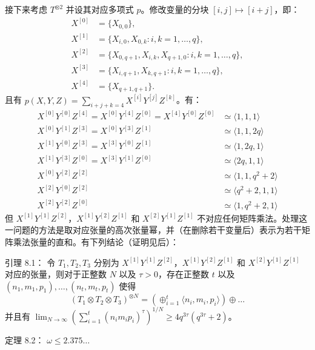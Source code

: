 \documentclass[11pt,fleqn, UTF8]{ctexbook} %
\begin{document}
接下来考虑 $T^{\otimes 2}$ 并设其对应多项式 $p$。修改变量的分块 $[i,j]\mapsto [i+j]$，即：
\begin{align}
X^{[0]}&=\{X_{0,0}\},\\
X^{[1]}&=\{X_{i,0}, X_{0,k}: i,k=1,\dots, q\},\\
X^{[2]}&=\{X_{0,q+1}, X_{i,k} ,X_{q+1,0}: i,k=1,\dots, q\},\\
X^{[3]}&=\{X_{i,q+1}, X_{k,q+1}: i,k=1,\dots, q\},\\
X^{[4]}&=\{X_{q+1,q+1}\}.
\end{align}
且有 $p(X,Y,Z)=\sum_{i+j+k=4} X^{[i]}Y^{[j]}Z^{[k]}$。有：
\begin{align}
X^{[0]}Y^{[0]}Z^{[4]}=X^{[0]}Y^{[4]}Z^{[0]}=X^{[4]}Y^{[0]}Z^{[0]}&\simeq\langle 1,1,1\rangle\\
X^{[0]}Y^{[1]}Z^{[3]}=X^{[0]}Y^{[3]}Z^{[1]}&\simeq\langle 1,1,2q\rangle\\
X^{[1]}Y^{[0]}Z^{[3]}=X^{[3]}Y^{[0]}Z^{[1]}&\simeq\langle 1,2q,1\rangle\\
X^{[1]}Y^{[3]}Z^{[0]}=X^{[3]}Y^{[1]}Z^{[0]}&\simeq\langle 2q,1,1\rangle\\
X^{[0]}Y^{[2]}Z^{[2]}&\simeq\langle 1,1,q^2+2\rangle\\
X^{[2]}Y^{[0]}Z^{[2]}&\simeq\langle q^2+2,1,1\rangle\\
X^{[2]}Y^{[2]}Z^{[0]}&\simeq\langle 1,q^2+2,1\rangle
\end{align}
但 $X^{[1]}Y^{[1]}Z^{[2]}$，$X^{[1]}Y^{[2]}Z^{[1]}$ 和 $X^{[2]}Y^{[1]}Z^{[1]}$ 不对应任何矩阵乘法。处理这一问题的方法是取对应张量的高次张量幂，并（在删除若干变量后）表示为若干矩阵乘法张量的直和。有下列结论（证明见后）：

引理 8.1\cite{coppersmith1990matrix}：
令 $T_1,T_2,T_3$ 分别为 $X^{[1]}Y^{[1]}Z^{[2]}$，$X^{[1]}Y^{[2]}Z^{[1]}$ 和 $X^{[2]}Y^{[1]}Z^{[1]}$ 对应的张量，则对于正整数 $N$ 以及 $\tau>0$，存在正整数 $t$ 以及 $(n_1,m_1,p_1),\dots,(n_t,m_t,p_t)$ 使得
$$
(T_1\otimes T_2\otimes T_3)^{\otimes N}=\left(\oplus_{i=1}^t \langle n_i,m_i,p_i\rangle\right)\oplus\dots
$$
并且有 $\lim_{N\to\infty}\left(\sum_{i=1}^t (n_i m_i p_i)^\tau\right)^{1/N} \geq 4q^{3\tau}(q^{3\tau}+2)$。

定理 8.2\cite{coppersmith1990matrix}：
$\omega\leq 2.375\dots$
\end{document}
